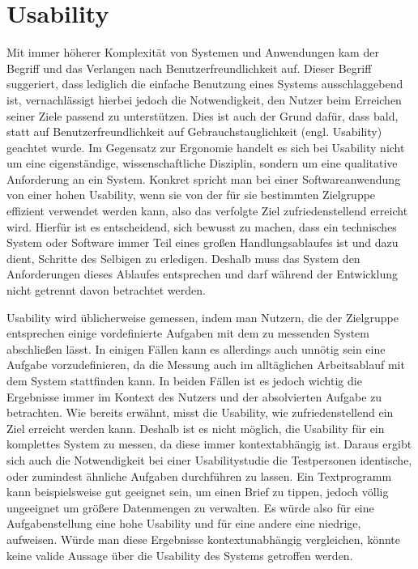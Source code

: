 \section{Usability}
\label{ch:usability}
Mit immer höherer Komplexität von Systemen und Anwendungen kam der Begriff und das Verlangen nach  \glqq Benutzerfreundlichkeit\grqq{} auf.
Dieser Begriff suggeriert, dass lediglich die einfache Benutzung eines Systems ausschlaggebend ist, vernachlässigt hierbei jedoch die Notwendigkeit, den Nutzer beim Erreichen seiner Ziele passend zu unterstützen.
Dies ist auch der Grund dafür, dass bald, statt auf \glqq Benutzerfreundlichkeit\grqq{}  auf \glqq Gebrauchstauglichkeit\grqq{}  (engl. Usability) geachtet wurde.
Im Gegensatz zur Ergonomie handelt es sich bei Usability nicht um eine eigenständige, wissenschaftliche Disziplin, sondern um eine qualitative Anforderung an ein System\cite{Sarodnick.2016}.
Konkret spricht man bei einer Softwareanwendung von einer hohen Usability, wenn sie von der für sie bestimmten Zielgruppe effizient verwendet werden kann, also das verfolgte Ziel zufriedenstellend erreicht wird\cite{Richter.2016}.
Hierfür ist es entscheidend, sich bewusst zu machen, dass ein technisches System oder Software immer Teil eines großen Handlungsablaufes ist und dazu dient, Schritte des Selbigen zu erledigen.
Deshalb muss das System den Anforderungen dieses Ablaufes entsprechen und darf während der Entwicklung nicht getrennt davon betrachtet werden\cite{Sarodnick.2016}.

Usability wird üblicherweise gemessen, indem man Nutzern, die der Zielgruppe entsprechen einige vordefinierte Aufgaben mit dem zu messenden System abschließen lässt. 
In einigen Fällen kann es allerdings auch unnötig sein eine Aufgabe vorzudefinieren, da die Messung auch im alltäglichen Arbeitsablauf mit dem System stattfinden kann.
In beiden Fällen ist es jedoch wichtig die Ergebnisse immer im Kontext des Nutzers und der absolvierten Aufgabe zu betrachten\cite{Nielsen.1995?}. 
Wie bereits erwähnt, misst die Usability, wie zufriedenstellend ein Ziel erreicht werden kann.
Deshalb ist es nicht möglich, die Usability für ein komplettes System zu messen, da diese immer kontextabhängig ist.
Daraus ergibt sich auch die Notwendigkeit bei einer Usabilitystudie die Testpersonen identische, oder zumindest ähnliche Aufgaben durchführen zu lassen.
Ein Textprogramm kann beispielsweise gut geeignet sein, um einen Brief zu tippen, jedoch völlig ungeeignet um größere Datenmengen zu verwalten. Es würde also für eine Aufgabenstellung eine hohe Usability und für eine andere eine niedrige, aufweisen. 
Würde man diese Ergebnisse kontextunabhängig vergleichen, könnte keine valide Aussage über die Usability des Systems getroffen werden.

